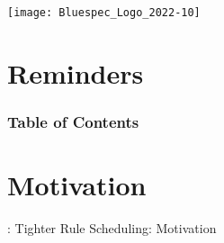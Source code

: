 


\date{L17: {\BSV}: Tighter Rule scheduling with CRegs}





\begin{frame}
\titlepage

\begin{center}
 \texttt{[image: Bluespec\_Logo\_2022-10]}
\end{center}

\end{frame}


\section{Reminders}




\begin{frame}
\frametitle{Table of Contents}

\tableofcontents

\end{frame}


\section{Motivation}

\begin{frame}

\begin{center}
  {\LARGE {\BSV}: Tighter Rule Scheduling: Motivation}
\end{center}

\end{frame}


